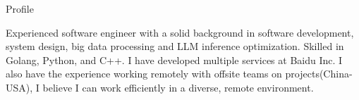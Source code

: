 \documentclass[
	11pt, %
]{resume} %
\begin{document}

\begin{rSection}{Profile}
	
    \item Experienced software engineer with a solid background in software development, system design, big data processing and LLM inference optimization. 
    Skilled in Golang, Python, and C++. I have developed multiple services at Baidu Inc. 
    I also have the experience working remotely with offsite teams on projects(China-USA), I believe I can work efficiently in a diverse, remote environment.\\
	
\end{rSection}


\end{document}
